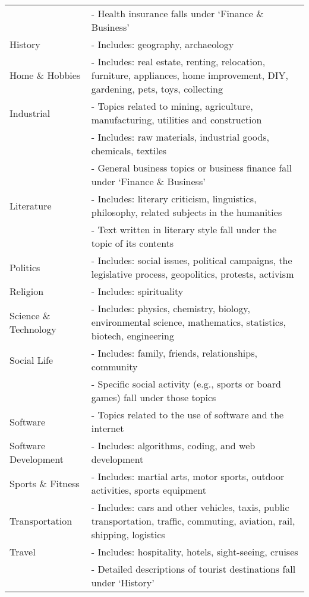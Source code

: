 \begin{table}[h!]
\begin{tabular}{l@{\hspace{8pt}}p{}}
   & - Health insurance falls under `Finance \& Business' \\
\addlinespace[0.05in]
History & - Includes: geography, archaeology \\
\addlinespace[0.05in]
Home \& Hobbies & - Includes: real estate, renting, relocation, furniture, appliances, home improvement, DIY, gardening, pets, toys, collecting \\
\addlinespace[0.05in]
Industrial & - Topics related to mining, agriculture, manufacturing, utilities and construction \\ 
            & - Includes: raw materials, industrial goods, chemicals, textiles \\ 
            & - General business topics or business finance fall under `Finance \& Business' \\
\addlinespace[0.05in]
Literature & - Includes: literary criticism, linguistics, philosophy, related subjects in the humanities \\
            & - Text written in literary style fall under the topic of its contents \\
\addlinespace[0.05in]
Politics & - Includes: social issues, political campaigns, the legislative process, geopolitics, protests, activism \\
\addlinespace[0.05in]
Religion & - Includes: spirituality \\
\addlinespace[0.05in]
Science \& Technology & - Includes: physics, chemistry, biology, environmental science, mathematics, statistics, biotech, engineering \\
\addlinespace[0.05in]
Social Life & - Includes: family, friends, relationships, community \\
            & - Specific social activity (e.g., sports or board games) fall under those topics \\
\addlinespace[0.05in]
Software & - Topics related to the use of software and the internet \\
\addlinespace[0.05in]
Software Development & - Includes: algorithms, coding, and web development \\
\addlinespace[0.05in]
Sports \& Fitness & - Includes: martial arts, motor sports, outdoor activities, sports equipment \\
\addlinespace[0.05in]
Transportation & - Includes: cars and other vehicles, taxis, public transportation, traffic, commuting, aviation, rail, shipping, logistics \\
\addlinespace[0.05in]
Travel & - Includes: hospitality, hotels, sight-seeing, cruises \\
            & - Detailed descriptions of tourist destinations fall under `History' \\
\bottomrule
\end{tabular}
    \icmlskip{-0.1in}
    \label{tab:list_of_topics}
\end{table}
